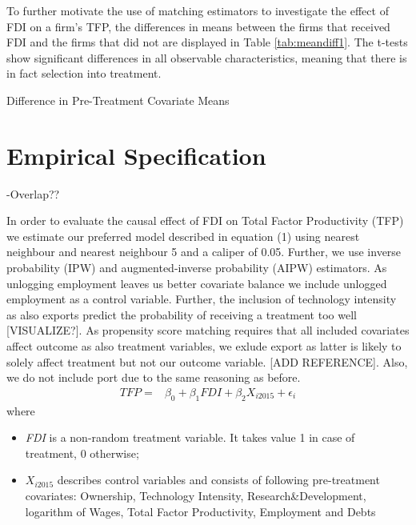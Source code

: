 \documentclass[a4paper,11pt]{scrartcl}
\begin{document}
To further motivate the use of matching estimators to investigate the effect of FDI on a firm's TFP, the differences in means between the firms that received FDI and the firms that did not are displayed in Table \ref{tab:meandiff1}. The t-tests show significant differences in all observable characteristics, meaning that there is in fact selection into treatment. 

\begin{table}[hbtp!]
	\centering
	\caption{Difference in Pre-Treatment Covariate Means}
	
	\label{tab:meandiff1}
\end{table}


\section{Empirical Specification}

-Overlap?? 

In order to evaluate the causal effect of FDI on Total Factor Productivity (TFP) we estimate our preferred model described in equation (1) using nearest neighbour and nearest neighbour 5 and a caliper of 0.05. Further, we use  inverse probability (IPW) and augmented-inverse probability (AIPW) estimators.
As unlogging employment leaves us better covariate balance we include unlogged employment as a control variable. Further, the inclusion of technology intensity as also exports predict the probability of receiving a treatment too well  [VISUALIZE?]. As propensity score matching requires that all included covariates affect outcome as also treatment variables, we exlude export as latter is likely to solely affect treatment but not our outcome variable. [ADD REFERENCE]. Also, we do not include port due to the same reasoning as before. 
\begin{align*}
TFP  =&  \beta_{0} + \beta_{1} FDI + \beta_{2} X_{i 2015} + \epsilon_{i}   
\end{align*}
where
\begin{itemize}
\item \textit{FDI} is a non-random treatment variable. It takes value 1 in case of treatment, 0 otherwise;
\item  $X_{i 2015}$ describes control variables and consists of following pre-treatment covariates: Ownership, Technology Intensity, Research\&Development, logarithm of Wages, Total Factor Productivity, Employment and Debts
\end{itemize}
\end{document}
